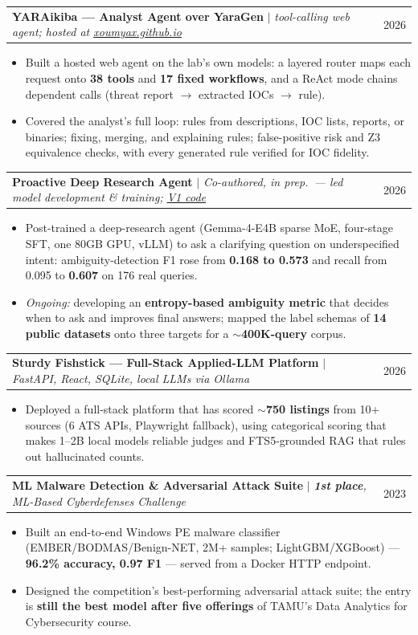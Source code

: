 \documentclass[letterpaper,11pt]{article}
\makeatletter
\newcommand{\resumeItem}[1]{
  \item\small{#1 \vspace{-3pt}}
}
\newcommand{\resumeProjectHeading}[2]{
    \item
    \begin{tabular*}{0.97\textwidth}{l@{\extracolsep{\fill}}r}
      \small#1 & #2 \\
    \end{tabular*}\vspace{-5pt}
}
\newcommand{\resumeItemListStart}{\begin{itemize}}
\newcommand{\resumeItemListEnd}{\end{itemize}\vspace{-6pt}}
\makeatother
\begin{document}
    \resumeProjectHeading
      {\textbf{YARAikiba --- Analyst Agent over YaraGen} $|$ \textit{tool-calling web agent; hosted at \href{https://xoumyax.github.io/}{\underline{xoumyax.github.io}}}}{2026}
      \resumeItemListStart
        \resumeItem{Built a hosted web agent on the lab's own models: a layered router maps each request onto \textbf{38 tools} and \textbf{17 fixed workflows}, and a ReAct mode chains dependent calls (threat report $\rightarrow$ extracted IOCs $\rightarrow$ rule).}
        \resumeItem{Covered the analyst's full loop: rules from descriptions, IOC lists, reports, or binaries; fixing, merging, and explaining rules; false-positive risk and Z3 equivalence checks, with every generated rule verified for IOC fidelity.}
      \resumeItemListEnd

    \resumeProjectHeading
      {\textbf{Proactive Deep Research Agent} $|$ \textit{Co-authored, in prep.\ --- led model development \& training; \href{https://github.com/xoumyax/ProPauseLM-Playground/tree/modified-prompt}{\underline{V1 code}}}}{2026}
      \resumeItemListStart
        \resumeItem{Post-trained a deep-research agent (Gemma-4-E4B sparse MoE, four-stage SFT, one 80GB GPU, vLLM) to ask a clarifying question on underspecified intent: ambiguity-detection F1 rose from \textbf{0.168 to 0.573} and recall from 0.095 to \textbf{0.607} on 176 real queries.}
        \resumeItem{\textit{Ongoing:} developing an \textbf{entropy-based ambiguity metric} that decides when to ask and improves final answers; mapped the label schemas of \textbf{14 public datasets} onto three targets for a $\sim$\textbf{400K-query} corpus.}
      \resumeItemListEnd

    \resumeProjectHeading
      {\textbf{Sturdy Fishstick --- Full-Stack Applied-LLM Platform} $|$ \textit{FastAPI, React, SQLite, local LLMs via Ollama}}{2026}
      \resumeItemListStart
        \resumeItem{Deployed a full-stack platform that has scored \textbf{$\sim$750 listings} from 10+ sources (6 ATS APIs, Playwright fallback), using categorical scoring that makes 1--2B local models reliable judges and FTS5-grounded RAG that rules out hallucinated counts.}
      \resumeItemListEnd

    \resumeProjectHeading
      {\textbf{ML Malware Detection \& Adversarial Attack Suite} $|$ \textit{\textbf{1st place}, ML-Based Cyberdefenses Challenge}}{2023}
      \resumeItemListStart
        \resumeItem{Built an end-to-end Windows PE malware classifier (EMBER/BODMAS/Benign-NET, 2M+ samples; LightGBM/XGBoost) --- \textbf{96.2\% accuracy, 0.97 F1} --- served from a Docker HTTP endpoint.}
        \resumeItem{Designed the competition's best-performing adversarial attack suite; the entry is \textbf{still the best model after five offerings} of TAMU's Data Analytics for Cybersecurity course.}
      \resumeItemListEnd
\end{document}
